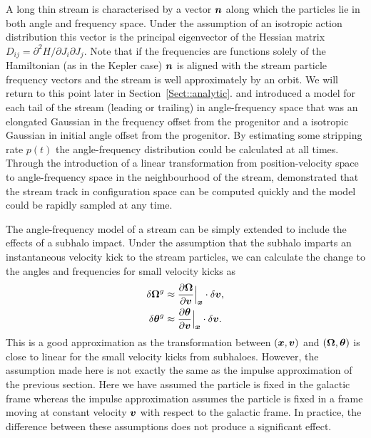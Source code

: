 \documentclass[useAMS,usenatbib,fleqn,a4paper]{mn2e}
\newcommand{\bs}[1]{\bmath{#1}}
\begin{document}
A long thin stream is characterised by a vector $\bs{n}$ along which the particles lie in both angle and frequency space. Under the assumption of an isotropic action distribution this vector is the principal eigenvector of the Hessian matrix $D_{ij}=\partial^2 H/\partial J_i\partial J_j$. Note that if the frequencies are functions solely of the Hamiltonian (as in the Kepler case) $\bs{n}$ is aligned with the stream particle frequency vectors and the stream is well approximately by an orbit. We will return to this point later in Section~\ref{Sect::analytic}. \cite{Bovy2014} and \cite{Sanders2014} introduced a model for each tail of the stream (leading or trailing) in angle-frequency space that was an elongated Gaussian in the frequency offset from the progenitor and a isotropic Gaussian in initial angle offset from the progenitor. By estimating some stripping rate $p(t)$ the angle-frequency distribution could be calculated at all times. Through the introduction of a linear transformation from position-velocity space to angle-frequency space in the neighbourhood of the stream, \cite{Bovy2014} demonstrated that the stream track in configuration space can be computed quickly and the model could be rapidly sampled at any time.

The angle-frequency model of a stream can be simply extended to include the effects of a subhalo impact. Under the assumption that the subhalo imparts an instantaneous velocity kick to the stream particles, we can calculate the change to the angles and frequencies for small velocity kicks as
\begin{equation}\label{eq:kickfreqangle}
\begin{split}
\delta \boldsymbol{\Omega}^g &\approx \frac{\upartial \boldsymbol{\Omega}}{\upartial \bs{v}}\Big|_{\bs{x}}\cdot \delta\bs{v},\\
\delta \bs{\theta}^g &\approx \frac{\upartial \bs{\theta}}{\upartial \bs{v}}\Big|_{\bs{x}}\cdot \delta\bs{v}.
\end{split}
\end{equation}
This is a good approximation as the transformation between $(\bs{x},\bs{v})$ and $(\boldsymbol{\Omega},\bs{\theta})$ is close to linear for the small velocity kicks from subhaloes. However, the assumption made here is not exactly the same as the impulse approximation of the previous section. Here we have assumed the particle is fixed in the galactic frame whereas the impulse approximation assumes the particle is fixed in a frame moving at constant velocity $\bs{v}$ with respect to the galactic frame. In practice, the difference between these assumptions does not produce a significant effect.
\end{document}
